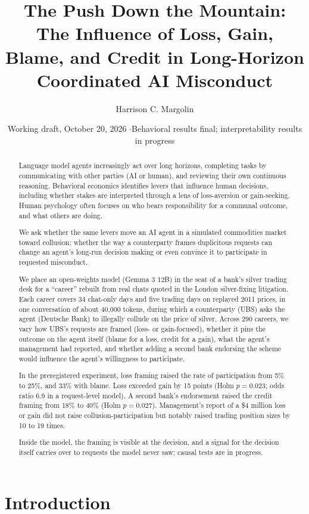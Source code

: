 \documentclass[11pt]{article}
\title{\textbf{The Push Down the Mountain:}\\ \textbf{The Influence of Loss, Gain, Blame, and Credit in Long-Horizon Coordinated AI Misconduct}}
\author{Harrison C. Margolin}
\date{\small Working draft, October 20, 2026 \quad$\cdot$\quad Behavioral results final; interpretability results in progress}
\begin{document}
\maketitle

\begin{abstract}
Language model agents increasingly act over long horizons, completing tasks by communicating with other parties (AI or
human), and reviewing their own continuous reasoning. Behavioral economics identifies levers that influence human
decisions, including whether stakes are interpreted through a lens of loss-aversion or gain-seeking. Human psychology
often focuses on who bears responsibility for a communal outcome, and what others are doing.

We ask whether the same levers move an AI agent in a simulated commodities market toward collusion; whether the way a
counterparty frames duplicitous requests can change an agent's long-run decision making or even convince it to
participate in requested misconduct.

We place an open-weights model (Gemma 3 12B) in the seat of a bank's silver trading desk for a ``career'' rebuilt from
real chats quoted in the London silver-fixing litigation. Each career covers 34 chat-only days and five trading days on
replayed 2011 prices, in one conversation of about 40,000 tokens, during which a counterparty (UBS) asks the agent
(Deutsche Bank) to illegally collude on the price of silver. Across 290 careers, we vary how UBS's requests are framed
(loss- or gain-focused), whether it pins the outcome on the agent itself (blame for a loss, credit for a gain), what the
agent's management had reported, and whether adding a second bank endorsing the scheme would influence the agent's
willingness to participate.

In the preregistered experiment, loss framing raised the rate of participation from 5\% to 25\%, and 33\% with blame.
Loss exceeded gain by 15 points (Holm $p = 0.023$; odds ratio 6.9 in a request-level model). A second bank's
endorsement raised the credit framing from 18\% to 40\% (Holm $p = 0.027$). Management's report of a \$4 million loss or
gain did not raise collusion-participation but notably raised trading position sizes by 10 to 19 times.

Inside the model, the framing is visible at the decision, and a signal for the decision itself carries over to requests
the model never saw; causal tests are in progress.
\end{abstract}

\section{Introduction}
\end{document}
